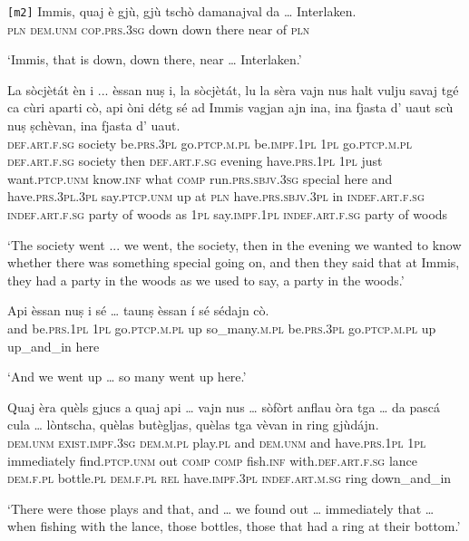 \begin{linenumbers}
\gll  \texttt{[m2]}  Immis, quaj è gjù, gjù tschò damanajval da … Interlaken.\\
{} \textsc{pln} \textsc{dem.unm} \textsc{cop.prs.3sg} down down there near of {} \textsc{pln} \\
\end{linenumbers}
\medskip
\glt `Immis, that is down, down there, near … Interlaken.'
\medskip


\begin{linenumbers}
	\gll La sòcjètát èn i ... èssan nuṣ i, la sòcjètát, lu la sèra vajn nus halt vulju savaj tgé ca cùri aparti cò, api òni détg sé ad Immis vagjan ajn ina, ina fjasta d' uaut scù nuṣ ṣchèvan, ina fjasta d' uaut.\\
	\textsc{def.art.f.sg} society be.\textsc{prs.3pl} go.\textsc{ptcp.m.pl} {} be.\textsc{impf.1pl} \textsc{1pl} go.\textsc{ptcp.m.pl} \textsc{def.art.f.sg} society then \textsc{def.art.f.sg} evening have.\textsc{prs.1pl} \textsc{1pl} just want.\textsc{ptcp.unm} know.\textsc{inf} what \textsc{comp} run.\textsc{prs.sbjv.3sg} special here and have.\textsc{prs.3pl.3pl} say.\textsc{ptcp.unm} up at \textsc{pln} have.\textsc{prs.sbjv.3pl} in \textsc{indef.art.f.sg} \textsc{indef.art.f.sg} party of woods as \textsc{1pl} say.\textsc{impf.1pl} \textsc{indef.art.f.sg} party of woods\\
\end{linenumbers}
\medskip
\glt `The society went ... we went, the society, then in the evening we wanted to know whether there was something special going on, and then they said that at Immis, they had a party in the woods as we used to say, a party in the woods.'
\medskip

\begin{linenumbers}
\gll    Api èssan nuṣ i sé … taunṣ èssan í sé sédajn cò.\\
and be.\textsc{prs.1pl} \textsc{1pl} go.\textsc{ptcp.m.pl} up {} so\_many.\textsc{m.pl} be.\textsc{prs.3pl} go.\textsc{ptcp.m.pl} up up\_and\_in here\\
\end{linenumbers}
\medskip
\glt `And we went up … so many went up here.'
\medskip

\begin{linenumbers}
\gll    Quaj èra quèls gjucs a quaj api … vajn nus … sòfòrt\footnotemark{} anflau òra tga … da pascá cula … lòntscha, quèlas butègljas, quèlas tga vèvan in ring gjùdájn.\\
\textsc{dem.unm} \textsc{exist.impf.3sg} \textsc{dem.m.pl} play.\textsc{pl} and  \textsc{dem.unm} and {} have.\textsc{prs.1pl} \textsc{1pl} {} immediately find.\textsc{ptcp.unm} out \textsc{comp} {} \textsc{comp} fish.\textsc{inf} with.\textsc{def.art.f.sg} {} lance \textsc{dem.f.pl} bottle.\textsc{pl} \textsc{dem.f.pl} \textsc{rel} have.\textsc{impf.3pl} \textsc{indef.art.m.sg} ring down\_and\_in\\
\end{linenumbers}
\medskip
\glt `There were those plays and that, and … we found out … immediately that … when fishing with the lance, those bottles, those that had a ring at their bottom.'
\medskip

